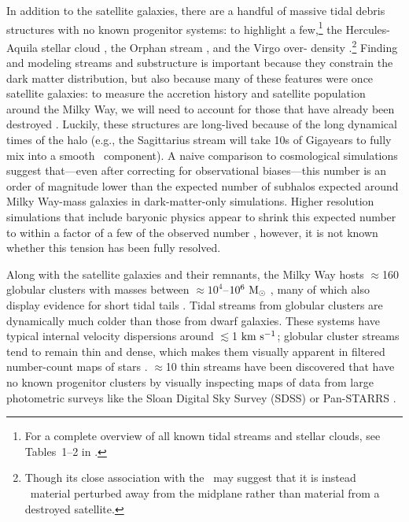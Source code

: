 In addition to the satellite galaxies, there are a handful of massive tidal
debris structures with no known progenitor systems: to highlight a
few,\footnote{For a complete overview of all known tidal streams and stellar
clouds, see Tables~1--2 in \cite{grillmair16}.} the Hercules-Aquila stellar
cloud \citep{belokurov07b}, the Orphan stream \citep{grillmair06b}, and the
Virgo over- density \citep{juric08}.\footnote{Though its close association with
the \mwdisk\ may suggest that it is instead \mwdisk\ material perturbed away
from the midplane rather than material from a destroyed satellite.} Finding and
modeling streams and substructure is important because they constrain the dark
matter distribution, but also because many of these features were once satellite
galaxies: to measure the accretion history and satellite population around the
Milky Way, we will need to account for those that have already been destroyed
\citep[e.g.,][]{johnston08}. Luckily, these structures are long-lived because of
the long dynamical times of the halo (e.g., the Sagittarius stream will take 10s
of Gigayears to fully mix into a smooth \mwhalo\ component). A naive comparison
to cosmological simulations suggest that---even after correcting for
observational biases---this number is an order of magnitude lower than the
expected number of subhalos expected around Milky Way-mass galaxies in
dark-matter-only simulations. Higher resolution simulations that include
baryonic physics appear to shrink this expected number to within a factor of a
few of the observed number \citep[e.g.,][]{zolotov12, brooks13,sawala16},
however, it is not known whether this tension has been fully resolved.

Along with the satellite galaxies and their remnants, the Milky Way hosts
$\approx$160 globular clusters with masses between $\approx$$10^4$--$10^6~\mathrm{M}_\odot$
\citep{harris10}, many of which also display evidence for short tidal tails
\citep{grillmair95, leon00}. Tidal streams from globular clusters are
dynamically much colder than those from dwarf galaxies. These systems have
typical internal velocity dispersions around $\lesssim$1$~\mathrm{km}~\mathrm{s}^{-1}$; globular
cluster streams tend to remain thin and dense, which makes them visually
apparent in filtered number-count maps of stars \citep{grillmair08}. $\approx$10
thin streams have been discovered that have no known progenitor clusters by
visually inspecting maps of data from large photometric surveys like the Sloan
Digital Sky Survey (SDSS) or Pan-STARRS \citep[e.g.,][]{grillmair06a, bonaca12,
bernard14}.

